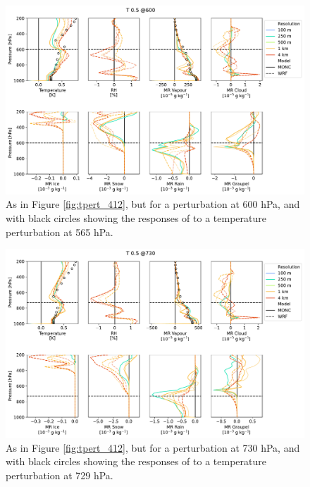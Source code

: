 \documentclass[draft]{agujournal2019}
\begin{document}
\begin{figure}[pth]
    \noindent\includegraphics[width=\textwidth]{figures/pert_diffs_T_0.5_@600}
    \caption{As in Figure \ref{fig:tpert_412}, but for a perturbation at 600
    hPa, and with black circles showing the responses of 
    to a temperature perturbation at 565 hPa.}
    \label{fig:tpert_600}
\end{figure}

\begin{figure}[pth]
    \noindent\includegraphics[width=\textwidth]{figures/pert_diffs_T_0.5_@730}
    \caption{As in Figure \ref{fig:tpert_412}, but for a perturbation at 730
    hPa, and with black circles showing the responses of 
    to a temperature perturbation at 729 hPa.}
    \label{fig:tpert_730}
\end{figure}
\end{document}
